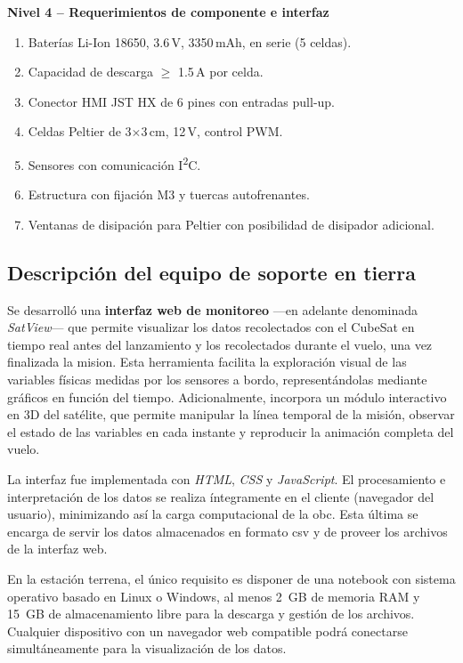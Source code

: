     \textbf{Nivel 4 – Requerimientos de componente e interfaz}
    \begin{enumerate}
        \item Baterías Li-Ion 18650, 3.6\,V, 3350\,mAh, en serie (5 celdas).
        \item Capacidad de descarga $\geq$ 1.5\,A por celda.
        \item Conector HMI JST HX de 6 pines con entradas pull-up.
        \item Celdas Peltier de 3$\times$3\,cm, 12\,V, control PWM.
        \item Sensores con comunicación I\textsuperscript{2}C.
        \item Estructura con fijación M3 y tuercas autofrenantes.
        \item Ventanas de disipación para Peltier con posibilidad de disipador adicional.
    \end{enumerate}

  \subsection{Descripción del equipo de soporte en tierra}
    Se desarrolló una \textbf{interfaz web de monitoreo} —en adelante denominada \emph{SatView}— que permite visualizar
    los datos recolectados con el CubeSat en tiempo real antes del lanzamiento y los recolectados durante el vuelo, una
    vez finalizada la mision.  Esta herramienta facilita la exploración visual de las variables físicas medidas por los
    sensores a bordo, representándolas mediante gráficos en función del tiempo.  Adicionalmente, incorpora un módulo
    interactivo en 3D del satélite, que permite manipular la línea temporal de la misión, observar el estado de las
    variables en cada instante y reproducir la animación completa del vuelo.

    La interfaz fue implementada con \emph{HTML}, \emph{CSS} y \emph{JavaScript}. El procesamiento e interpretación de
    los datos se realiza íntegramente en el cliente (navegador del usuario), minimizando así la carga computacional de
    la \acrshort{obc}. Esta última se encarga de servir los datos almacenados en formato \acrshort{csv} y de proveer los
    archivos de la interfaz web.

    En la estación terrena, el único requisito es disponer de una notebook con sistema operativo basado en Linux o
    Windows, al menos 2~GB de memoria RAM y 15~GB de almacenamiento libre para la descarga y gestión de los archivos.
    Cualquier dispositivo con un navegador web compatible podrá conectarse simultáneamente para la visualización de los
    datos.

